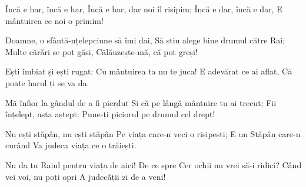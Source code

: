 \beginverse
Încă e har, încă e har,
Încă e har, dar noi îl risipim;
Încă e dar, încă e dar,
E mântuirea ce noi o primim!
\endverse

\beginchorus
Doamne, o sfântă-nțelepciune să îmi dai,
Să știu alege bine drumul către Rai;
Multe cărări se pot găsi,
Călăuzește-mă, că pot greși!
\endchorus

\beginverse
Ești îmbiat și ești rugat:
Cu mântuirea ta nu te juca!
E adevărat ce ai aflat,
Că poate harul ți se va da.
\endverse

\beginchorus
Mă înfior la gândul de a fi pierdut
Și că pe lângă mântuire tu ai trecut;
Fii înțelept, asta aștept:
Pune-ți piciorul pe drumul cel drept!
\endchorus

\beginverse
Nu ești stăpân, nu ești stăpân
Pe viața care-n veci o risipești;
E un Stăpân care-n curând
Va judeca viața ce o trăiești.
\endverse

\beginchorus
Nu da tu Raiul pentru viața de aici!
De ce spre Cer ochii nu vrei să-i ridici?
Când vei voi, nu poți opri
A judecății zi de a veni!
\endchorus
\endsong